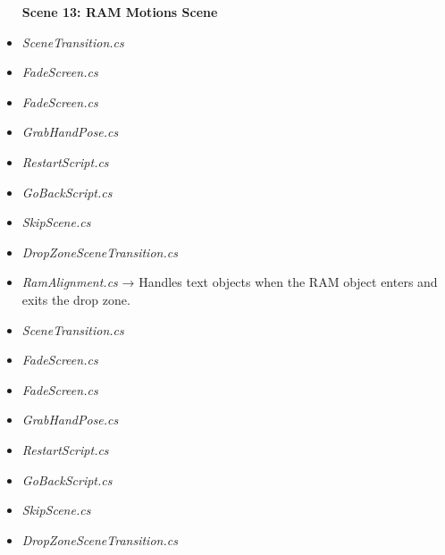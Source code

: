 \documentclass[10pt,twocolumn]{article}
\begin{document}
\begin{itemize}
    \textbf{Scene 13:  RAM Motions Scene}\\
    \item \textit{SceneTransition.cs}\\
    \item \textit{FadeScreen.cs}
\end{itemize}
 
\begin{itemize}
    \textbf{Scene 14:  RAM Install Scene }\\
    \item \textit{FadeScreen.cs}\\
    \item \textit{GrabHandPose.cs}\\
    \item \textit{RestartScript.cs}\\
    \item \textit{GoBackScript.cs}\\
    \item \textit{SkipScene.cs}\\
    \item \textit{DropZoneSceneTransition.cs}\\
    \item \textit{RamAlignment.cs} → Handles text objects when the RAM object enters and exits the drop zone. 
\end{itemize}

\begin{itemize}
    \textbf{Scene 15: SSD Informational Scene}\\
    \item \textit{SceneTransition.cs}\\
    \item \textit{FadeScreen.cs}
\end{itemize}

\begin{itemize}
    \textbf{Scene 16:  SSD Placement Scene}\\
    \item \textit{FadeScreen.cs}\\
    \item \textit{GrabHandPose.cs}\\
    \item \textit{RestartScript.cs}\\
    \item \textit{GoBackScript.cs}\\
    \item \textit{SkipScene.cs}\\
    \item \textit{DropZoneSceneTransition.cs}
\end{itemize}
\end{document}
